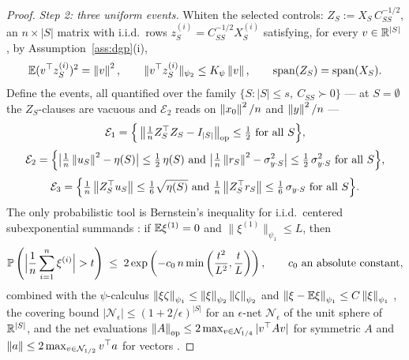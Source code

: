 \begin{proof}
{\emph{Step 2: three uniform events.} Whiten the selected controls:
$Z_S := X_S\, C_{SS}^{-1/2}$, an $n \times |S|$ matrix with i.i.d.\
rows $z_S^{(i)} = C_{SS}^{-1/2} X_S^{(i)}$ satisfying, for every
$v \in \mathbb{R}^{|S|}$, by Assumption~\ref{ass:dgp}(i),
\begin{equation}\label{eq:appc-whiten}
        \mathbb{E} ( v^\top z_S^{(i)} )^2 = \left\lVert v \right\rVert^2,
        \qquad
        \| v^\top z_S^{(i)} \|_{\psi_2} \le K_\psi \left\lVert v \right\rVert,
        \qquad
        \operatorname{span}(Z_S) = \operatorname{span}(X_S).
\end{equation}
Define the events, all quantified over the family
$\{ S : |S| \le s,\ C_{SS} \succ 0 \}$ --- at $S = \emptyset$ the
$Z_S$-clauses are vacuous and $\mathcal E_2$ reads on
$\left\lVert x_0 \right\rVert^2/n$ and $\left\lVert y \right\rVert^2/n$ ---
\begin{equation}\label{eq:appc-E1}
        \mathcal E_1
        =
        \Big\{ \left\lVert  \tfrac1n Z_S^\top Z_S - I_{|S|}  \right\rVert_{\operatorname{op}}
        \le \tfrac12 \ \text{for all } S \Big\},
\end{equation}
\begin{equation}\label{eq:appc-E2}
        \mathcal E_2
        =
        \Big\{
        \big| \tfrac1n \left\lVert u_S \right\rVert^2 - \eta(S) \big|
        \le \tfrac12\, \eta(S)
        \ \text{and}\
        \big| \tfrac1n \left\lVert r_S \right\rVert^2 - \sigma_{y \cdot S}^2 \big|
        \le \tfrac12\, \sigma_{y \cdot S}^2
        \ \text{for all } S \Big\},
\end{equation}
\begin{equation}\label{eq:appc-E3}
        \mathcal E_3
        =
        \Big\{
        \tfrac1n \left\lVert  Z_S^\top u_S  \right\rVert
        \le \tfrac16 \sqrt{\eta(S)}
        \ \text{and}\
        \tfrac1n \left\lVert  Z_S^\top r_S  \right\rVert
        \le \tfrac16\, \sigma_{y \cdot S}
        \ \text{for all } S \Big\}.
\end{equation}
The only probabilistic tool is Bernstein's inequality for i.i.d.\
centered subexponential summands \citep[\S2.8]{vershynin2018hdp}: if
$\mathbb{E} \xi^{(1)} = 0$ and $\| \xi^{(1)} \|_{\psi_1} \le L$, then
\begin{equation}\label{eq:appc-bernstein}
        \mathbb{P}\left( \Big| \frac1n \sum_{i=1}^n \xi^{(i)} \Big|
        > t \right)
        \;\le\;
        2 \exp\left( - c_0\, n
        \min\left( \frac{t^2}{L^2}, \frac{t}{L} \right) \right),
        \qquad c_0 \ \text{an absolute constant},
\end{equation}
combined with the $\psi$-calculus
$\left\lVert \xi \zeta \right\rVert_{\psi_1} \le \left\lVert \xi \right\rVert_{\psi_2}
\left\lVert \zeta \right\rVert_{\psi_2}$ and
$\left\lVert  \xi - \mathbb{E} \xi  \right\rVert_{\psi_1} \le C \left\lVert \xi \right\rVert_{\psi_1}$
\citep[\S2.7]{vershynin2018hdp}, the covering bound
$| \mathcal N_\epsilon | \le (1 + 2/\epsilon)^{|S|}$ for an
$\epsilon$-net $\mathcal N_\epsilon$ of the unit sphere of
$\mathbb{R}^{|S|}$, and
the net evaluations
$\left\lVert A \right\rVert_{\operatorname{op}} \le 2 \max_{v \in \mathcal N_{1/4}} | v^\top A v |$
for symmetric $A$ and
$\left\lVert a \right\rVert \le 2 \max_{v \in \mathcal N_{1/2}} v^\top a$ for vectors
\citep[\S4.2, \S4.4]{vershynin2018hdp}.

}
\end{proof}
